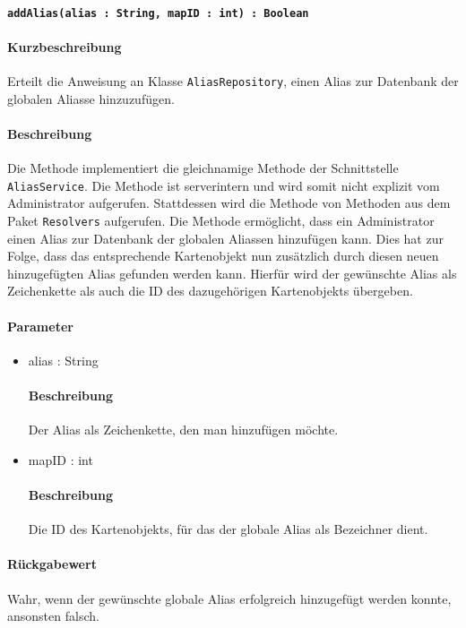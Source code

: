 \paragraph{\texttt{addAlias(alias : String, mapID : int) : Boolean}}%
\paragraph*{Kurzbeschreibung}
Erteilt die Anweisung an Klasse \texttt{AliasRepository}, einen Alias zur Datenbank der globalen Aliasse hinzuzufügen.
\paragraph*{Beschreibung}
Die Methode implementiert die gleichnamige Methode der Schnittstelle \texttt{AliasService}.
Die Methode ist serverintern und wird somit nicht explizit vom Administrator aufgerufen.
Stattdessen wird die Methode von Methoden aus dem Paket \texttt{Resolvers} aufgerufen.
Die Methode ermöglicht, dass ein Administrator einen Alias zur Datenbank der globalen Aliassen hinzufügen kann.
Dies hat zur Folge, dass das entsprechende Kartenobjekt nun zusätzlich durch diesen neuen hinzugefügten Alias gefunden werden kann.
Hierfür wird der gewünschte Alias als Zeichenkette als auch die ID des dazugehörigen Kartenobjekts übergeben.
\paragraph*{Parameter}
\begin{itemize}
    \item alias : String
    		\paragraph*{Beschreibung}
    		Der Alias als Zeichenkette, den man hinzufügen möchte.
    \item mapID : int
    		\paragraph*{Beschreibung}
    		Die ID des Kartenobjekts, für das der globale Alias als Bezeichner dient.
\end{itemize}
\paragraph*{Rückgabewert}
Wahr, wenn der gewünschte globale Alias erfolgreich hinzugefügt werden konnte, ansonsten falsch.
